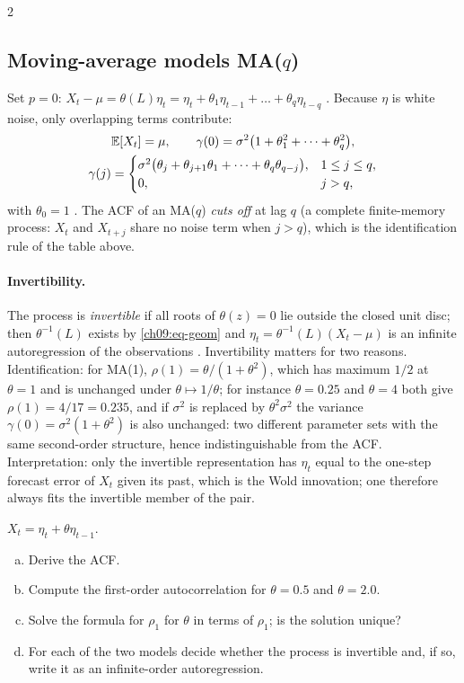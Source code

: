 \begin{paracol}{2}
\subsection{Moving-average models MA($q$)}\label{ch09:sec-ma}
Set $p=0$: $X_t-\mu=\theta(L)\eta_t=\eta_t+\theta_1\eta_{t-1}+\dots+\theta_q\eta_{t-q}$
. Because $\eta$ is white noise, only overlapping terms contribute:
\begin{equation}\label{ch09:eq-ma}
  \begin{gathered}
  \mathbb{E}[X_t]=\mu,\qquad \gamma(0)=\sigma^2\bigl(1+\theta_1^2+\dots+\theta_q^2\bigr),\\
  \gamma(j)=\begin{cases}\sigma^2\bigl(\theta_j+\theta_{j+1}\theta_1+\dots+\theta_q\theta_{q-j}\bigr),&1\le j\le q,\\ 0,& j>q,\end{cases}
  \end{gathered}
\end{equation}
with $\theta_0=1$ . The ACF of an MA($q$) \emph{cuts off} at lag $q$ (a complete finite-memory
process: $X_t$ and $X_{t+j}$ share no noise term when $j>q$), which is the identification rule of the table above.

\paragraph{Invertibility.} The process is \emph{invertible} if all roots of $\theta(z)=0$ lie outside the closed unit
disc; then $\theta^{-1}(L)$ exists by \eqref{ch09:eq-geom} and $\eta_t=\theta^{-1}(L)(X_t-\mu)$ is an infinite
autoregression of the observations . Invertibility matters for two reasons. Identification: for
MA(1), $\rho(1)=\theta/(1+\theta^2)$, which has maximum $1/2$ at $\theta=1$ and is unchanged under
$\theta\mapsto1/\theta$; for instance $\theta=0.25$ and $\theta=4$ both give $\rho(1)=4/17=0.235$, and if $\sigma^2$ is replaced by $\theta^2\sigma^2$ the variance
$\gamma(0)=\sigma^2(1+\theta^2)$ is also unchanged: two different parameter sets with the same second-order structure, hence
indistinguishable from the ACF. Interpretation: only the invertible
representation has $\eta_t$ equal to the one-step forecast error of $X_t$ given its past, which is the Wold innovation; one
therefore always fits the invertible member of the pair.

\begin{exercise}\label{ch09:ex-ps4-5}
$X_t=\eta_t+\theta\eta_{t-1}$.
\begin{enumerate}[(a)]
  \item Derive the ACF.
  \item Compute the first-order autocorrelation for $\theta=0.5$ and $\theta=2.0$.
  \item Solve the formula for $\rho_1$ for $\theta$ in terms of $\rho_1$; is the solution unique?
  \item For each of the two models decide whether the process is invertible and, if so, write it as an infinite-order autoregression.
\end{enumerate}
\end{exercise}


\end{paracol}
